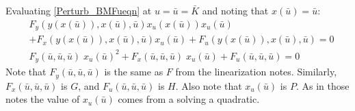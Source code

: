 \documentclass[letterpaper,12pt]{article}
\theoremstyle{definition}
\begin{document}
\begin{spacing}{1.5}
	Evaluating \eqref{Perturb_BMFueqn} at $u = \bar u = \bar K$ and noting that $x(\bar u) = \bar u$:
	\begin{align}
		& F_y(y(x(\bar u)),x(\bar u),\bar u) x_u(x(\bar u)) x_u(\bar u) \nonumber \\
		& + F_x(y(x(\bar u)),x(\bar u),\bar u) x_u(\bar u) + F_u(y(x(\bar u)),x(\bar u),\bar u) = 0 \nonumber \\
		& F_y(\bar u,\bar u,\bar u)\; x_u(\bar u)^2 + F_x(\bar u,\bar u,\bar u)\; x_u(\bar u) + F_u(\bar u,\bar u,\bar u)  = 0 \nonumber
	\end{align}
	Note that $F_y(\bar u,\bar u,\bar u)$ is the same as $F$ from the linearization notes.  Similarly, $F_x(\bar u,\bar u,\bar u)$ is $G$, and $F_u(\bar u,\bar u,\bar u)$ is $H$.  Also note that $x_u(\bar u)$ is $P$.  As in those notes the value of $x_u(\bar u)$ comes from a solving a quadratic.


\end{spacing}
\end{document}
